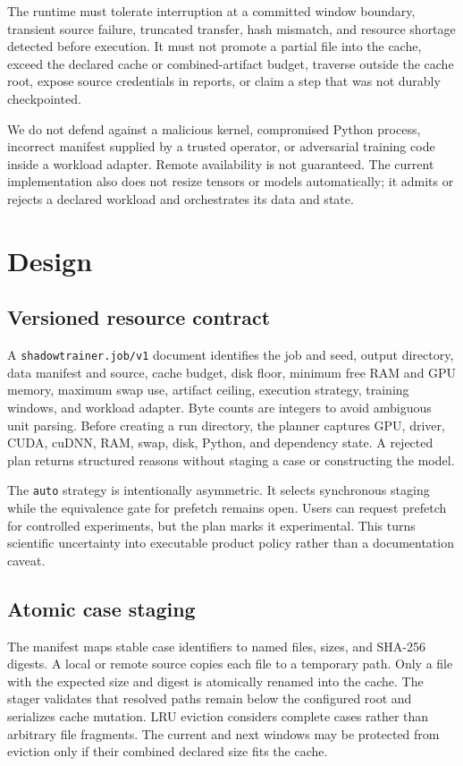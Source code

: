 \documentclass[10pt,twocolumn]{article}
\begin{document}
The runtime must tolerate interruption at a committed window boundary,
transient source failure, truncated transfer, hash mismatch, and resource
shortage detected before execution. It must not promote a partial file into the
cache, exceed the declared cache or combined-artifact budget, traverse outside
the cache root, expose source credentials in reports, or claim a step that was
not durably checkpointed.

We do not defend against a malicious kernel, compromised Python process,
incorrect manifest supplied by a trusted operator, or adversarial training
code inside a workload adapter. Remote availability is not guaranteed. The
current implementation also does not resize tensors or models automatically;
it admits or rejects a declared workload and orchestrates its data and state.

\section{Design}

\subsection{Versioned resource contract}

A \texttt{shadowtrainer.job/v1} document identifies the job and seed, output
directory, data manifest and source, cache budget, disk floor, minimum free RAM
and GPU memory, maximum swap use, artifact ceiling, execution strategy,
training windows, and workload adapter. Byte counts are integers to avoid
ambiguous unit parsing. Before creating a run directory, the planner captures
GPU, driver, CUDA, cuDNN, RAM, swap, disk, Python, and dependency state. A
rejected plan returns structured reasons without staging a case or constructing
the model.

The \texttt{auto} strategy is intentionally asymmetric. It selects synchronous
staging while the equivalence gate for prefetch remains open. Users can request
prefetch for controlled experiments, but the plan marks it experimental. This
turns scientific uncertainty into executable product policy rather than a
documentation caveat.

\subsection{Atomic case staging}

The manifest maps stable case identifiers to named files, sizes, and SHA-256
digests. A local or remote source copies each file to a temporary path. Only a
file with the expected size and digest is atomically renamed into the cache.
The stager validates that resolved paths remain below the configured root and
serializes cache mutation. LRU eviction considers complete cases rather than
arbitrary file fragments. The current and next windows may be protected from
eviction only if their combined declared size fits the cache.
\end{document}
